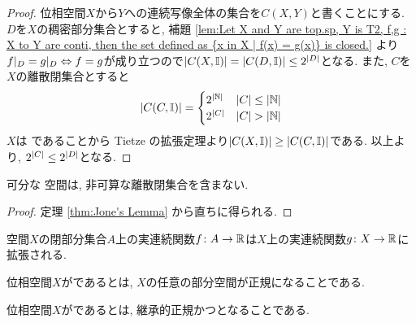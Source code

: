 \documentclass[uplatex, dvipdfmx, a4paper, 12pt, class=jsbook, crop=false]{standalone}
\begin{document}
\begin{proof}
	位相空間$ X $から$ Y $への連続写像全体の集合を$ C(X, Y) $と書くことにする. $ D $を$ X $の稠密部分集合とすると, 補題 \ref{lem:Let X and Y are top.sp, Y is T2, f,g : X to Y are conti, then the set defined as {x in X | f(x) = g(x)} is closed.} より$ f|_D = g|_D  \Leftrightarrow f =g $が成り立つので$ \left|C(X, \mathbb{I})\right| = \left|C(D, \mathbb{I})\right| \leq 2^{\left|D\right|} $となる. また, $ C $を$ X $の離散閉集合とすると
	$$ \left|C(C, \mathbb{I})\right| =\begin{cases}
	2^{\left|\mathbb{N}\right|} & \left|C\right| \leq \left|\mathbb{N}\right|\\
	2^{\left|C\right|} & \left|C\right| > \left|\mathbb{N}\right|
	\end{cases} $$
	$ X $は  であることから Tietze の拡張定理より$ \left|C(X, \mathbb{I})\right| \geq \left|C(C, \mathbb{I})\right| $である. 以上より, $ 2^{\left|C\right|} \leq 2^{\left|D\right|} $となる.
\end{proof}

\begin{corollary}
	\label{coro:Corollary of Jone's Lamma}
	可分な  空間は, 非可算な離散閉集合を含まない.
\end{corollary}

\begin{proof}
	定理 \ref{thm:Jone's Lemma} から直ちに得られる.
\end{proof}

\begin{theorem}[\Tietze]
	\label{thm:Tietze's extension theorem}
	 空間$ X $の閉部分集合$ A $上の実連続関数$ f \colon A \to \mathbb{R} $は$ X $上の実連続関数$ g \colon X \to \mathbb{R} $に拡張される.
\end{theorem}

\begin{definition}
	位相空間$ X $がであるとは, $ X $の任意の部分空間が正規になることである.
\end{definition}

\begin{definition}
	位相空間$ X $がであるとは, 継承的正規かつとなることである.
\end{definition}
\end{document}
